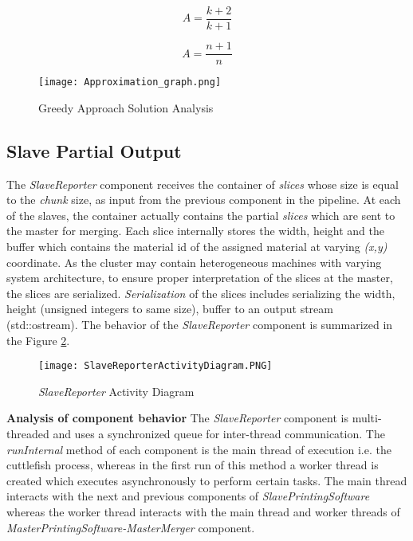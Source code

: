 \begin{equation}
\label{eq:App1}
A = \frac{k+2}{k+1} 
\end{equation}

\begin{equation}
\label{eq:App2}
A =\frac{n+1}{n}
\end{equation}

\begin{figure}[ht!]
\centering
\texttt{[image: Approximation\_graph.png]}
\caption{Greedy Approach Solution Analysis}
\label{fig:AppG}
\end{figure}

\subsection{Slave Partial Output} \label{SRepoComp}

The \textit{SlaveReporter} component receives the container of \textit{slices} whose size is equal to the \textit{chunk} size, as input from the previous component in the pipeline. At each of the slaves, the container actually contains the partial \textit{slices} which are sent to the master for merging.  Each slice internally stores the width, height and the buffer which contains the material id of the assigned material at varying \textit{(x,y)} coordinate. As the cluster may contain heterogeneous machines with varying system architecture, to ensure proper interpretation of the slices at the master, the slices are serialized. \textit{Serialization} of the slices includes serializing the width, height (unsigned integers to same size), buffer to an output stream (std::ostream). The behavior of the \textit{SlaveReporter} component is summarized in the Figure \ref{fig:SlaveReporterActivityDiagram}. \newline
\begin{figure}[ht!]
\centering
\texttt{[image: SlaveReporterActivityDiagram.PNG]}
\caption{\textit{SlaveReporter} Activity Diagram}
\label{fig:SlaveReporterActivityDiagram}
\end{figure}

\textbf{Analysis of component behavior}
\newline
The \textit{SlaveReporter} component is multi-threaded and uses a synchronized queue for inter-thread communication. The \textit{runInternal} method of each component is the main thread of execution i.e. the cuttlefish process, whereas in the first run of this method a worker thread is created which executes asynchronously to perform certain tasks. The main thread interacts with the next and previous components of \textit{SlavePrintingSoftware} whereas the worker thread interacts with the main thread and worker threads of \textit{MasterPrintingSoftware-MasterMerger} component. \newline

